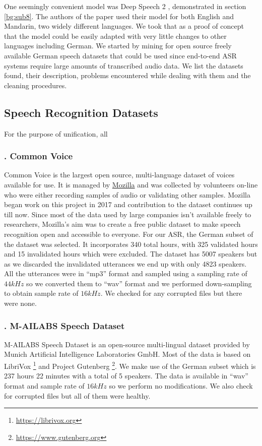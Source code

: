 One seemingly convenient model was Deep Speech 2 \cite{amodei2016deep}, demonstrated in section \ref{bg:sub8}. The authors of the paper used their model for both English and Mandarin, two widely different languages. We took that as a proof of concept that the model could be easily adapted with very little changes to other languages including German. We started by mining for open source freely available German speech datasets that could be used since end-to-end \ac{ASR} systems require large amounts of transcribed audio data. We list the datasets found, their description, problems encountered while dealing with them and the cleaning procedures.


\subsection{Speech Recognition Datasets}
\label{meth:sub1}

For the purpose of unification, all

\subsubsection{. Common Voice}
\label{meth:subsubsub1}

Common Voice is the largest open source, multi-language dataset of voices available for use. It is managed by \href{https://www.mozilla.org/en-US/}{Mozilla} and was collected by volunteers on-line who were either recording samples of audio or validating other samples. Mozilla began work on this project in 2017 and contribution to the dataset continues up till now. Since most of the data used by large companies isn't available freely to researchers, Mozilla's aim was to create a free public dataset to make speech recognition open and accessible to everyone.
For our \ac{ASR}, the German subset of the dataset was selected. It incorporates 340 total hours, with 325 validated hours and 15 invalidated hours which were excluded. The dataset has 5007 speakers but as we discarded the invalidated utterances we end up with only 4823 speakers. 
All the utterances were in \enquote{mp3} format and sampled using a sampling rate of $44 kHz$ so we converted them to \enquote{wav} format and we performed down-sampling to obtain sample rate of $16 kHz$. We checked for any corrupted files but there were none.


\subsubsection{. M-AILABS Speech Dataset}
\label{meth:subsub2}
M-AILABS Speech Dataset is an open-source multi-lingual dataset provided by Munich Artificial Intelligence Laboratories GmbH. Most of the data is based on LibriVox \footnote{\url{https://librivox.org}} and Project Gutenberg \footnote{\url{https://www.gutenberg.org}}. We make use of the German subset which is 237 hours 22 minutes with a total of 5 speakers. The data is available in \enquote{wav} format and sample rate of $16 kHz$ so we perform no modifications. We also check for corrupted files but all of them were healthy.

